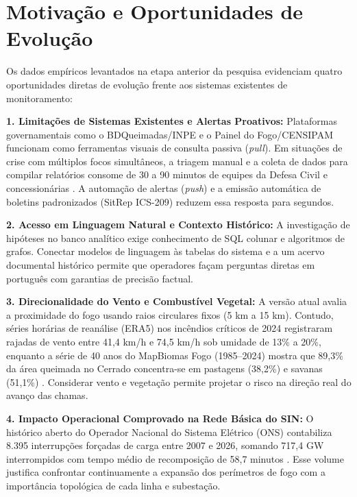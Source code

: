 \section{Motivação e Oportunidades de Evolução}
\label{sc:motivacao}

Os dados empíricos levantados na etapa anterior da pesquisa \cite{sampaio2026ic} evidenciam quatro oportunidades diretas de evolução frente aos sistemas existentes de monitoramento:

\textbf{1. Limitações de Sistemas Existentes e Alertas Proativos:} Plataformas governamentais como o BDQueimadas/INPE e o Painel do Fogo/CENSIPAM funcionam como ferramentas visuais de consulta passiva (\textit{pull}). Em situações de crise com múltiplos focos simultâneos, a triagem manual e a coleta de dados para compilar relatórios consome de 30 a 90 minutos de equipes da Defesa Civil e concessionárias \cite{endsley1995toward}. A automação de alertas (\textit{push}) e a emissão automática de boletins padronizados (SitRep ICS-209) reduzem essa resposta para segundos.

\textbf{2. Acesso em Linguagem Natural e Contexto Histórico:} A investigação de hipóteses no banco analítico exige conhecimento de SQL colunar e algoritmos de grafos. Conectar modelos de linguagem às tabelas do sistema e a um acervo documental histórico permite que operadores façam perguntas diretas em português com garantias de precisão factual.

\textbf{3. Direcionalidade do Vento e Combustível Vegetal:} A versão atual avalia a proximidade do fogo usando raios circulares fixos (5 km a 15 km). Contudo, séries horárias de reanálise (ERA5) nos incêndios críticos de 2024 registraram rajadas de vento entre 41,4 km/h e 74,5 km/h sob umidade de 13\% a 20\%, enquanto a série de 40 anos do MapBiomas Fogo (1985--2024) mostra que 89,3\% da área queimada no Cerrado concentra-se em pastagens (38,2\%) e savanas (51,1\%) \cite{mapbiomas2026fogo}. Considerar vento e vegetação permite projetar o risco na direção real do avanço das chamas.

\textbf{4. Impacto Operacional Comprovado na Rede Básica do SIN:} O histórico aberto do Operador Nacional do Sistema Elétrico (ONS) contabiliza 8.395 interrupções forçadas de carga entre 2007 e 2026, somando 717,4 GW interrompidos com tempo médio de recomposição de 58,7 minutos \cite{ons2026dadosabertos}. Esse volume justifica confrontar continuamente a expansão dos perímetros de fogo com a importância topológica de cada linha e subestação.
